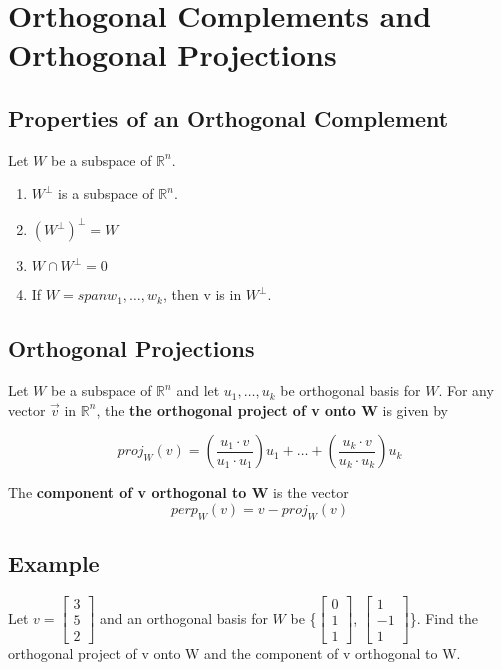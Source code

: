 \section{Orthogonal Complements and Orthogonal Projections}
\subsection*{Properties of an Orthogonal Complement}
Let $W$ be a subspace of $\mathbb{R}^n$.
\begin{enumerate}
    \item $W^\perp$ is a subspace of $\mathbb{R}^n.$
    \item $(W^\perp)^\perp = W$
    \item $W\cap W^\perp = {0}$
    \item If $W = span{w_1,\dots, w_k}$, then v is in $W^\perp$.
\end{enumerate}
\subsection*{Orthogonal Projections}
Let $W$ be a subspace of $\mathbb{R}^n$ and let ${u_1,\dots,u_k}$ be orthogonal basis for $W$. For any vector $\vec{v}$ in $\mathbb{R}^n$, the \textbf{the orthogonal project of v onto W} is given by

$$proj_W(v) = (\frac{u_1\cdot v}{u_1\cdot u_1})u_1 + \dots + (\frac{u_k\cdot v}{u_k\cdot u_k})u_k$$

The \textbf{component of v orthogonal to W} is the vector
$$perp_W(v) = v - proj_W(v)$$

\subsection*{Example}
Let $v = \begin{bmatrix}
    3\\5\\2
\end{bmatrix}$ and an orthogonal basis for $W$ be \{$\begin{bmatrix}
    0\\1\\1
\end{bmatrix}$, $\begin{bmatrix}
    1\\-1\\1
\end{bmatrix}$\}. Find the orthogonal project of v onto W and the component of v orthogonal to W.
